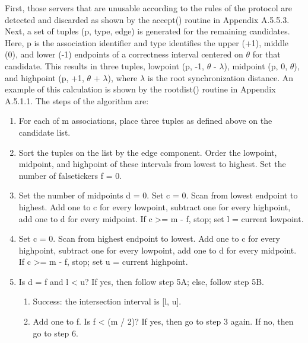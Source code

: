 First, those servers that are unusable according to the rules of the
protocol are detected and discarded as shown by the accept() routine
in Appendix A.5.5.3.  Next, a set of tuples (p, type, edge) is
generated for the remaining candidates.  Here, p is the association
identifier and type identifies the upper (+1), middle (0), and lower
(-1) endpoints of a correctness interval centered on $ \theta $ for that
candidate.  This results in three tuples, lowpoint (p, -1, $ \theta $ -
$ \lambda $), midpoint (p, 0, $ \theta $), and highpoint (p, +1, $ \theta $ +
$ \lambda $), where $ \lambda $ is the root synchronization distance.  An
example of this calculation is shown by the rootdist() routine in
Appendix A.5.1.1.  The steps of the algorithm are:

\begin{enumerate}
  \item For each of m associations, place three tuples as defined above
    on the candidate list.

  \item Sort the tuples on the list by the edge component.  Order the
    lowpoint, midpoint, and highpoint of these intervals from lowest to
    highest.  Set the number of falsetickers f = 0.

  \item Set the number of midpoints d = 0.  Set c = 0.  Scan from lowest
    endpoint to highest.  Add one to c for every lowpoint, subtract one
    for every highpoint, add one to d for every midpoint.  If c >= m - f,
    stop; set l = current lowpoint.

  \item Set c = 0.  Scan from highest endpoint to lowest.  Add one to c
    for every highpoint, subtract one for every lowpoint, add one to d
    for every midpoint.  If c >= m - f, stop; set u = current highpoint.

  \item Is d = f and l < u?  If yes, then follow step 5A; else, follow
    step 5B.

    \begin{enumerate}[5A.]
      \item Success: the intersection interval is [l, u].

      \item Add one to f.  Is f < (m / 2)?  If yes, then go to step 3 again.
        If no, then go to step 6.
    \end{enumerate}


\end{enumerate}
